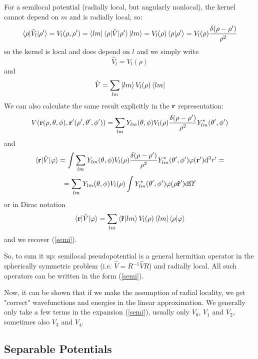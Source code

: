 For a semilocal potential (radially local, but angularly nonlocal), the kernel cannot depend on $m$ and is radially local, so: 
\begin{equation*}
  \mathinner{\langle{\rho|\hat V_l|\rho'}\rangle}=V_l(\rho,\rho') =\mathinner{\langle{lm}|}\mathinner{\langle{\rho|\hat V|\rho'}\rangle}\mathinner{|{lm}\rangle} =V_l(\rho)\mathinner{\langle{\rho|\rho'}\rangle} =V_l(\rho){\delta(\rho-\rho')\over\rho^2}
\end{equation*}
so the kernel is local and does depend on $l$ and we simply write 
\begin{equation*}
  \hat V_l=V_l(\rho)
\end{equation*}
and 
\begin{equation}
  \hat V=\sum_{lm} \mathinner{|{lm}\rangle}V_l(\rho)\mathinner{\langle{lm}|}  \label{semi}
\end{equation}
We can also calculate the same result explicitly in the $\bf r$ representation: 
\begin{equation*}
  V({\bf r}(\rho,\theta,\phi), {\bf r'}(\rho',\theta',\phi'))= \sum_{lm}Y_{lm}(\theta,\phi) V_l(\rho){\delta(\rho-\rho')\over\rho^2} Y_{lm}^*(\theta',\phi')
\end{equation*}
and 
\begin{equation*}
  \mathinner{\langle{{\bf r}|\hat V|\varphi}\rangle}=\int \sum_{lm}Y_{lm}(\theta,\phi) V_l(\rho){\delta(\rho-\rho')\over\rho^2} Y_{lm}^*(\theta',\phi') \varphi({\bf r'}){\rm d}^3r'=
\end{equation*}
\begin{equation*}
  = \sum_{lm}Y_{lm}(\theta,\phi) V_l(\rho) \int Y_{lm}^*(\theta',\phi') \varphi(\rho{\bf\hat r'}){\rm d}\Omega'
\end{equation*}
or in Dirac notation 
\begin{equation*}
  \mathinner{\langle{{\bf r}|\hat V|\varphi}\rangle}= \sum_{lm} \mathinner{\langle{{\bf\hat r}|lm}\rangle}V_l(\rho) \mathinner{\langle{lm}|}\mathinner{\langle{\rho|\varphi}\rangle}
\end{equation*}
and we recover (\ref{semi}).

So, to sum it up: semilocal pseudopotential is a general hermitian operator in the spherically symmetric problem (i.e. $\hat V=R^{-1}\hat VR$) and radially local. All such operators can be written in the form (\ref{semi}).

Now, it can be shown that if we make the assumption of radial locality, we get "correct" wavefunctions and energies in the linear approximation. We generally only take a few terms in the expansion (\ref{semi}), usually only $V_0$, $V_1$ and $V_2$, sometimes also $V_3$ and $V_4$.

\subsection{Separable Potentials}

